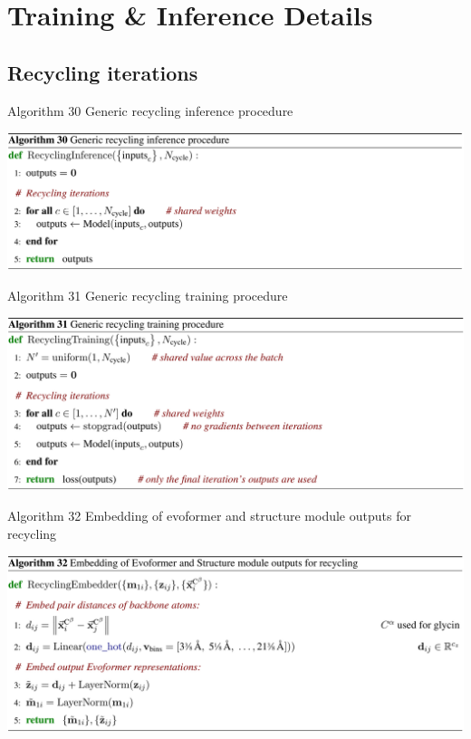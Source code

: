 \documentclass[presentation, smaller]{beamer}
\begin{document}
\section*{Training \& Inference Details}
\label{sec:orgcb95690}
\subsection*{Recycling iterations}
\label{sec:org7c0fa47}
\begin{frame}[label={sec:org1f655fb}]{Algorithm 30 Generic recycling inference procedure \cite{jumperHighlyAccurateProtein2021}}
\begin{center}
\includegraphics[width=.9\linewidth]{./imgs/algo30_recycling.png}
\end{center}
\end{frame}
\begin{frame}[label={sec:org3a0fdc1}]{Algorithm 31 Generic recycling training procedure \cite{jumperHighlyAccurateProtein2021}}
\begin{center}
\includegraphics[width=.9\linewidth]{./imgs/algo31_generic-recycling.png}
\end{center}
\end{frame}
\begin{frame}[label={sec:orgef69377}]{Algorithm 32 Embedding of evoformer and structure module outputs for recycling \cite{jumperHighlyAccurateProtein2021}}
\begin{center}
\includegraphics[width=.9\linewidth]{./imgs/algo32_recycling-embedding.png}
\end{center}
\end{frame}
\end{document}
